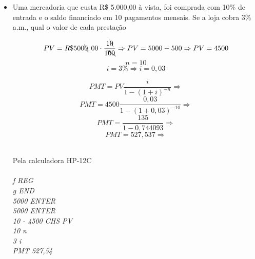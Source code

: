 \documentclass[a4paper, 12pt]{article}
\begin{document}
\begin{itemize}
\item Uma mercadoria que custa R\$ 5.000,00 à vista, foi comprada com 10\% de 
entrada e o saldo financiado em 10 pagamentos mensais. Se a loja cobra 3\% 
a.m., qual o valor de cada prestação

$$ PV = R\$500\bcancel{0},00 \cdot \frac{1\bcancel{0}}{1\bcancel{00}} \Rightarrow PV = 5000 - 500 \Rightarrow PV = 4500 $$
$$ n = 10 $$
$$ i = 3\% \Rightarrow i = 0,03 $$

$$ PMT = PV\frac{i}{1-(1+i)^{-n}} \Rightarrow $$
$$ PMT = 4500\frac{0,03}{1-(1+0,03)^{-10}} \Rightarrow $$
$$ PMT = \frac{135}{1-0,744093} \Rightarrow $$
$$ \boxed{PMT = 527,537} \Rightarrow $$

\\
Pela calculadora HP-12C\\\\
\emph{f REG}\\
\emph{g END}\\
\emph{5000 ENTER}\\
\emph{5000 ENTER}\\
\emph{10  - 4500 CHS PV} \\
\emph{10 n}\\
\emph{3 i}\\
\emph{PMT 527,54}\\

\end{itemize}
\end{document}
